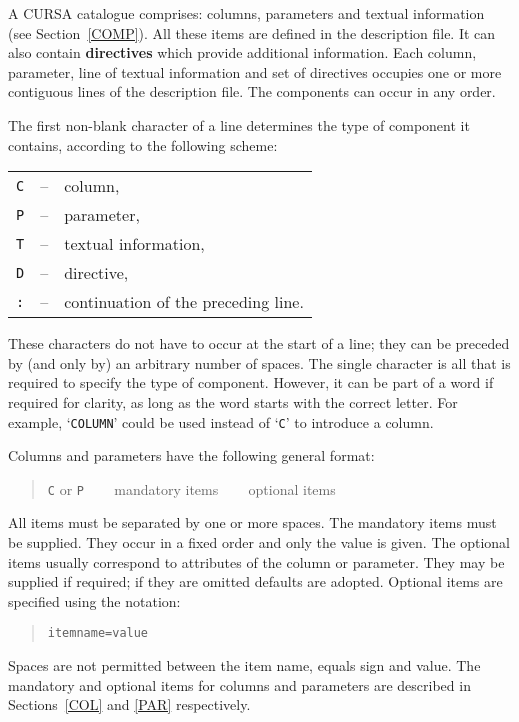\documentclass[twoside,11pt]{article}
\renewcommand{\_}{\texttt{\symbol{95}}}
\begin{document}
A CURSA catalogue comprises: columns, parameters and textual information
(see Section~\ref{COMP}).  All these items are defined in the description
file.  It can also contain {\bf directives} which provide additional
information.  Each column, parameter, line of textual information and set
of directives occupies one or more contiguous lines of the description
file.  The components can occur in any order.

The first non-blank character of a line determines the type of component
it contains, according to the following scheme:

\begin{tabular}{lcl}
{\tt C} & -- & column,              \\
{\tt P} & -- & parameter,           \\
{\tt T} & -- & textual information, \\
{\tt D} & -- & directive,           \\
{\tt :} & -- & continuation of the preceding line.  \\
\end{tabular}

These characters do not have to occur at the start of a line; they can
be preceded by (and only by) an arbitrary number of spaces.  The single
character is all that is required to specify the type of component.
However, it can be part of a word if required for clarity, as long as
the word starts with the correct letter.  For example, `{\tt COLUMN}'
could be used instead of `{\tt C}' to introduce a column.

Columns and parameters have the following general format:

\begin{quote}
{\tt C} or {\tt P} ~~~ mandatory items ~~~ optional items
\end{quote}

All items must be separated by one or more spaces.  The 
mandatory items must be supplied.  They occur in a fixed order and
only the value is given.  The optional items usually
correspond to attributes of the column or parameter.  They may be
supplied if required; if they are omitted defaults are adopted.
Optional items are specified using the notation:

\begin{quote}
{\tt item\_name=value}
\end{quote}

Spaces are not permitted between the item name, equals sign and value.
The mandatory and optional items for columns and parameters are
described in Sections~\ref{COL} and \ref{PAR} respectively.
\end{document}
